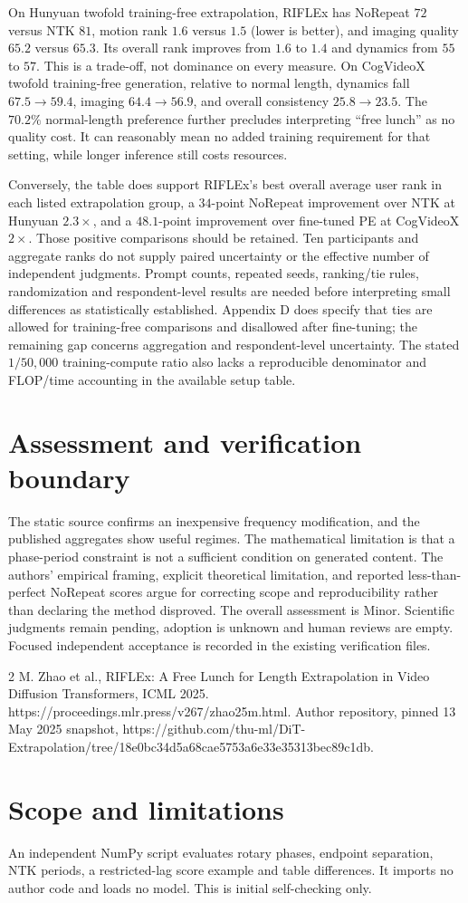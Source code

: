 \documentclass[10pt]{article}
\begin{document}
On Hunyuan twofold training-free extrapolation, RIFLEx has NoRepeat \(72\) versus NTK \(81\), motion rank \(1.6\) versus \(1.5\) (lower is better), and imaging quality \(65.2\) versus \(65.3\). Its overall rank improves from \(1.6\) to \(1.4\) and dynamics from \(55\) to \(57\). This is a trade-off, not dominance on every measure. On CogVideoX twofold training-free generation, relative to normal length, dynamics fall \(67.5\to59.4\), imaging \(64.4\to56.9\), and overall consistency \(25.8\to23.5\). The \(70.2\%\) normal-length preference further precludes interpreting “free lunch” as no quality cost. It can reasonably mean no added training requirement for that setting, while longer inference still costs resources.\par
Conversely, the table does support RIFLEx’s best overall average user rank in each listed extrapolation group, a \(34\)-point NoRepeat improvement over NTK at Hunyuan \(2.3\times\), and a \(48.1\)-point improvement over fine-tuned PE at CogVideoX \(2\times\). Those positive comparisons should be retained. Ten participants and aggregate ranks do not supply paired uncertainty or the effective number of independent judgments. Prompt counts, repeated seeds, ranking/tie rules, randomization and respondent-level results are needed before interpreting small differences as statistically established. Appendix D does specify that ties are allowed for training-free comparisons and disallowed after fine-tuning; the remaining gap concerns aggregation and respondent-level uncertainty. The stated \(1/50{,}000\) training-compute ratio also lacks a reproducible denominator and FLOP/time accounting in the available setup table.\par
\section*{Assessment and verification boundary}
The static source confirms an inexpensive frequency modification, and the published aggregates show useful regimes. The mathematical limitation is that a phase-period constraint is not a sufficient condition on generated content. The authors’ empirical framing, explicit theoretical limitation, and reported less-than-perfect NoRepeat scores argue for correcting scope and reproducibility rather than declaring the method disproved. The overall assessment is Minor. Scientific judgments remain pending, adoption is unknown and human reviews are empty. Focused independent acceptance is recorded in the existing verification files.\par
2 M. Zhao et al., RIFLEx: A Free Lunch for Length Extrapolation in Video Diffusion Transformers, ICML 2025. https://proceedings.mlr.press/v267/zhao25m.html. Author repository, pinned 13 May 2025 snapshot, https://github.com/thu-ml/DiT-Extrapolation/tree/18e0bc34d5a68cae5753a6e33e35313bec89c1db.\par
\section*{Scope and limitations}
An independent NumPy script evaluates rotary phases, endpoint separation, NTK periods, a restricted-lag score example and table differences. It imports no author code and loads no model. This is initial self-checking only.\par
\end{document}
